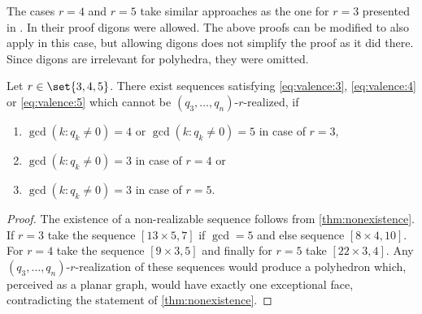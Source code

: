 \begin{remark}
  The cases $r=4$ and $r=5$ take similar approaches as the one for $r=3$ presented in \cite{ConvexPolytopes}. In their proof digons were allowed. The above proofs can be modified to also apply in this case, but allowing digons does not simplify the proof as it did there. Since digons are irrelevant for polyhedra, they were omitted.
\end{remark}
\newpage
\begin{corollary}
  Let $r \in \set{3, 4, 5}$. There exist sequences satisfying \autoref{eq:valence:3}, \autoref{eq:valence:4} or \autoref{eq:valence:5} which cannot be $(q_3, \dots, q_n)$-$r$-realized, if 
  \begin{enumerate}[label=(\roman*)]
    \item $\gcd (k : q_k \neq 0) = 4$ or $\gcd (k : q_k \neq 0) = 5$ in case of $r = 3$, 
    \item $\gcd (k : q_k \neq 0) = 3$ in case of $r = 4$ or 
    \item $\gcd (k : q_k \neq 0) = 3$ in case of $r = 5$. 
  \end{enumerate}
  \begin{proof}
The existence of a non-realizable sequence follows from \autoref{thm:nonexistence}. If $r=3$ take the sequence $[13 \times 5, 7]$ if $\gcd = 5$ and else sequence $[8 \times 4, 10]$. For $r=4$ take the sequence $[9 \times 3, 5]$ and finally for $r=5$ take $[22 \times 3, 4]$. Any $(q_3, \dots, q_n)$-$r$-realization of these sequences would produce a polyhedron which, perceived as a planar graph, would have exactly one exceptional face, contradicting the statement of \autoref{thm:nonexistence}.
  \end{proof}
\end{corollary}
